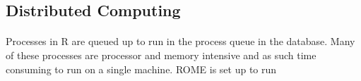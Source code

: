 \subsection{Distributed Computing}

\paragraph{}
Processes in R are queued up to run in the process queue in the database. Many of these processes are processor and memory intensive and as such time consuming to run on a single machine. ROME is set up to run